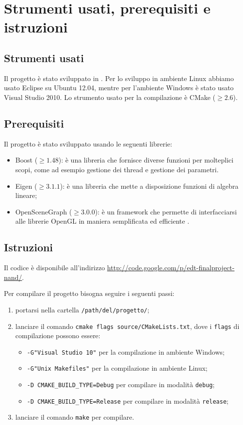 \section{Strumenti usati, prerequisiti e istruzioni}
\subsection{Strumenti usati}
Il progetto è stato sviluppato in \cpp. Per lo sviluppo in ambiente Linux abbiamo usato Eclipse su Ubuntu 12.04, mentre per l'ambiente Windows è stato usato Visual Studio 2010. Lo strumento usato per la compilazione è CMake ($\geq 2.6$).

\subsection{Prerequisiti}
Il progetto è stato sviluppato usando le seguenti librerie:
\begin{itemize}[noitemsep]
  \item Boost ($\geq 1.48$): è una libreria che fornisce diverse funzioni per molteplici scopi, come ad esempio gestione dei thread e gestione dei parametri.
  \item Eigen ($\geq 3.1.1$): è una libreria che mette a disposizione funzioni di algebra lineare;
  \item OpenSceneGraph ($\geq 3.0.0$): è un framework che permette di interfacciarsi alle librerie OpenGL in maniera semplificata ed efficiente \cite{osgbeginner}\cite{osgcookbook}.
\end{itemize}

\subsection{Istruzioni}
Il codice è disponibile all'indirizzo \url{http://code.google.com/p/edt-finalproject-nand/}.

Per compilare il progetto bisogna seguire i seguenti passi:
\begin{enumerate}
  \item portarsi nella cartella \verb!/path/del/progetto/!;
  \item lanciare il comando \verb!cmake flags source/CMakeLists.txt!, dove i \verb!flags! di compilazione possono essere:
    \begin{itemize}[noitemsep]
      \item \verb!-G"Visual Studio 10"! per la compilazione in ambiente Windows;
      \item \verb!-G"Unix Makefiles"! per la compilazione in ambiente Linux;
    \end{itemize}
    \begin{itemize}[noitemsep]
      \item \verb!-D CMAKE_BUILD_TYPE=Debug! per compilare in modalità \verb!debug!;
      \item \verb!-D CMAKE_BUILD_TYPE=Release! per compilare in modalità \verb!release!;
    \end{itemize}
  \item lanciare il comando \verb!make! per compilare.
\end{enumerate}


